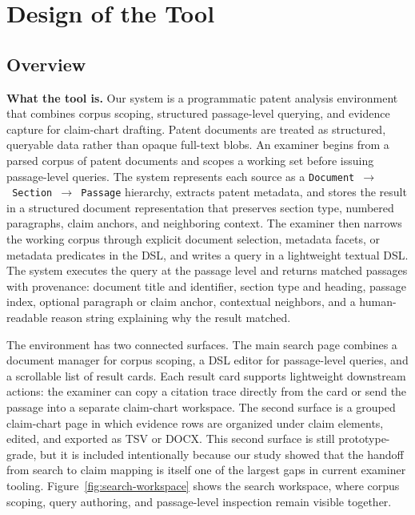 \documentclass[sigconf]{acmart}
\begin{document}
\section{Design of the Tool}

\subsection{Overview}

\smallskip\noindent\textbf{What the tool is.}
Our system is a programmatic patent analysis environment that combines corpus
scoping, structured passage-level querying, and evidence capture for
claim-chart drafting. Patent documents are treated as structured, queryable
data rather than opaque full-text blobs. An examiner begins from a parsed
corpus of patent documents and scopes a working set before issuing
passage-level queries. The system represents each source as a
\texttt{Document~$\to$~Section~$\to$~Passage} hierarchy, extracts patent
metadata, and stores the result in a structured document representation that
preserves section type, numbered paragraphs, claim anchors, and neighboring
context. The examiner then narrows the working corpus through explicit document
selection, metadata facets, or metadata predicates in the DSL, and writes a
query in a lightweight textual DSL. The system executes the query at the
passage level and returns matched passages with provenance:
document title and identifier, section type and heading, passage index,
optional paragraph or claim anchor, contextual neighbors, and a human-readable
reason string explaining why the result matched.

The environment has two connected surfaces. The main search page combines a
document manager for corpus scoping, a DSL editor for passage-level queries,
and a scrollable list of result cards. Each result card supports lightweight
downstream actions: the examiner can copy a citation trace directly from the
card or send the passage into a separate claim-chart workspace. The second
surface is a grouped claim-chart page in which evidence rows are organized
under claim elements, edited, and exported as TSV or DOCX. This second surface
is still prototype-grade, but it is included intentionally because our study
showed that the handoff from search to claim mapping is itself one of the
largest gaps in current examiner tooling. Figure~\ref{fig:search-workspace}
shows the search workspace, where corpus scoping, query authoring, and
passage-level inspection remain visible together.
\end{document}
